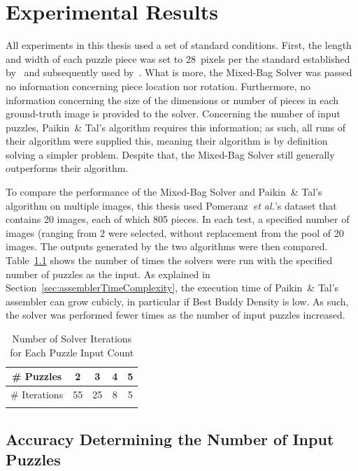 \chapter{Experimental Results}

All experiments in this thesis used a set of standard conditions.  First, the length and width of each puzzle piece was set to 28~pixels per the standard established by~\cite{cho2010} and subsequently used by~\cite{pomeranz2011, gallagher2012, sholomon2013, paikin2015}. What is more, the Mixed-Bag Solver was passed no information concerning piece location nor rotation.  Furthermore, no information concerning the size of the dimensions or number of pieces in each ground-truth image is provided to the solver.  Concerning the number of input puzzles, Paikin~\& Tal's algorithm requires this information; as such, all runs of their algorithm were supplied this, meaning their algorithm is by definition solving a simpler problem.  Despite that, the Mixed-Bag Solver still generally outperforms their algorithm.

To compare the performance of the Mixed-Bag Solver and Paikin~\& Tal's algorithm on multiple images, this thesis used Pomeranz~\textit{et al.}'s dataset that contains 20 images, each of which 805 pieces.  In each test, a specified number of images (ranging from 2 were selected, without replacement from the pool of 20 images.  The outputs generated by the two algorithms were then compared.  Table~\ref{tab:numberSolverIterations} shows the number of times the solvers were run with the specified number of puzzles as the input. As explained in Section~\ref{sec:assemblerTimeComplexity}, the execution time of Paikin~\& Tal's assembler can grow cubicly, in particular if Best Buddy Density is low.  As such, the solver was performed fewer times as the number of input puzzles increased.

\begin{table}[tb]
\begin{center}
\begin{tabular}{ |c||c|c|c|c| } 
 \Xhline{1pt}
 \# Puzzles    &  2 &  3 & 4 & 5 \\ 
\hline \hline
 \# Iterations & 55 & 25 & 8 & 5 \\ 
 \Xhline{1pt}
\end{tabular}
\end{center}
\caption{Number of Solver Iterations for Each Puzzle Input Count}\label{tab:numberSolverIterations}
\end{table}

\section{Accuracy Determining the Number of Input Puzzles}

